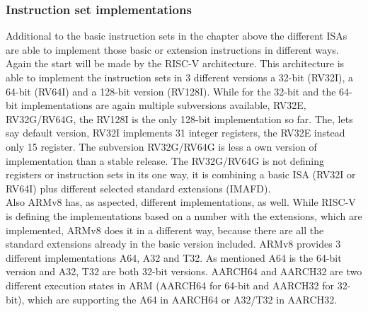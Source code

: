 \documentclass[conference]{IEEEtran}
\begin{document}
\subsubsection{Instruction set implementations}
Additional to the basic instruction sets in the chapter above the different \glspl{ISA} are able to implement those basic or extension instructions in different ways. Again the start will be made by the RISC-V architecture. This architecture is able to implement the instruction sets in 3 different versions a 32-bit (RV32I), a 64-bit (RV64I) and a 128-bit version (RV128I).
While for the 32-bit and the 64-bit implementations are again multiple subversions available, RV32E, RV32G/RV64G, the RV128I is the only 128-bit implementation so far. The, lets say default version, RV32I implements 31 integer registers, the RV32E instead only 15 register. The subversion RV32G/RV64G is less a own version of implementation than a stable release. The RV32G/RV64G is not defining registers or instruction sets in its one way, it is combining a basic \gls{ISA} (RV32I or RV64I) plus different selected standard extensions (IMAFD). \cite{Asanovic2016} \\
Also ARMv8 has, as aspected, different implementations, as well. While RISC-V is defining the implementations based on a number with the extensions, which are implemented, ARMv8 does it in a different way, because there are all the standard extensions already in the basic version included.
ARMv8 provides 3 different implementations A64, A32 and T32. As mentioned A64 is the 64-bit version and A32, T32  are both 32-bit versions.
AARCH64 and AARCH32 are two different execution states in ARM (AARCH64 for 64-bit and AARCH32 for 32-bit), which are supporting the A64 in AARCH64 or A32/T32 in AARCH32.\cite{ArmManual}\\
\end{document}
